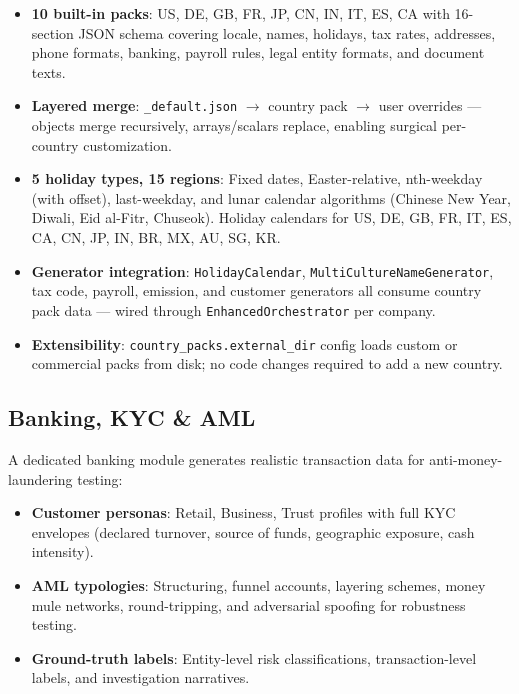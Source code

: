 \documentclass[11pt,a4paper]{article}
\begin{document}
\begin{itemize}[leftmargin=1.4em, itemsep=2pt]
  \item \textbf{10 built-in packs}: US, DE, GB, FR, JP, CN, IN, IT, ES, CA with
        16-section JSON schema covering locale, names, holidays, tax rates,
        addresses, phone formats, banking, payroll rules, legal entity formats,
        and document texts.
  \item \textbf{Layered merge}: \texttt{\_default.json} $\to$ country pack $\to$
        user overrides --- objects merge recursively, arrays/scalars replace,
        enabling surgical per-country customization.
  \item \textbf{5 holiday types, 15 regions}: Fixed dates, Easter-relative,
        nth-weekday (with offset), last-weekday, and lunar calendar algorithms
        (Chinese New Year, Diwali, Eid al-Fitr, Chuseok). Holiday calendars
        for US, DE, GB, FR, IT, ES, CA, CN, JP, IN, BR, MX, AU, SG, KR.
  \item \textbf{Generator integration}: \texttt{HolidayCalendar},
        \texttt{MultiCultureNameGenerator}, tax code, payroll, emission, and
        customer generators all consume country pack data --- wired through
        \texttt{EnhancedOrchestrator} per company.
  \item \textbf{Extensibility}: \texttt{country\_packs.external\_dir} config
        loads custom or commercial packs from disk; no code changes required
        to add a new country.
\end{itemize}

\subsection{Banking, KYC \& AML}

A dedicated banking module generates realistic transaction data for
anti-money-laundering testing:

\begin{itemize}[leftmargin=1.4em, itemsep=2pt]
  \item \textbf{Customer personas}: Retail, Business, Trust profiles with
        full KYC envelopes (declared turnover, source of funds, geographic
        exposure, cash intensity).
  \item \textbf{AML typologies}: Structuring, funnel accounts, layering
        schemes, money mule networks, round-tripping, and adversarial
        spoofing for robustness testing.
  \item \textbf{Ground-truth labels}: Entity-level risk classifications,
        transaction-level labels, and investigation narratives.
\end{itemize}
\end{document}
